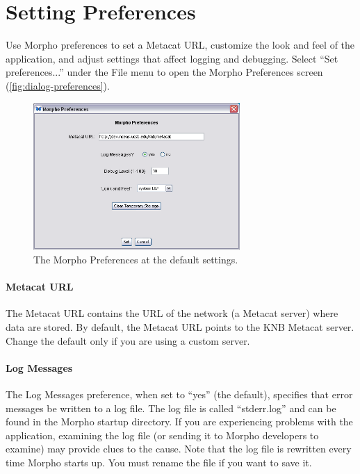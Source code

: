 \section{Setting Preferences} \label{sec:preferences}

Use Morpho preferences to set a Metacat URL, customize the look and feel
of the application, and adjust settings that affect logging and
debugging. Select ``Set preferences...'' under the File menu to open the
Morpho Preferences screen (\autoref{fig:dialog-preferences}).

\begin{figure}
  \centering
    \includegraphics[width=0.7\textwidth]{images/dialog-preferences.png}
  \caption{The Morpho Preferences at the default settings.}
  \label{fig:dialog-preferences}
\end{figure}

\paragraph{Metacat URL} The Metacat URL contains the URL of the network (a Metacat
server) where data are stored. By default, the Metacat URL points to the
KNB Metacat server. Change the default only if you are using a custom
server.

\paragraph{Log Messages} The Log Messages preference, when set to ``yes'' (the
default), specifies that error messages be written to a log file. The
log file is called ``stderr.log'' and can be found in the Morpho startup
directory. If you are experiencing problems with the application,
examining the log file (or sending it to Morpho developers to examine)
may provide clues to the cause. Note that the log file is rewritten
every time Morpho starts up. You must rename the file if you want to
save it.

